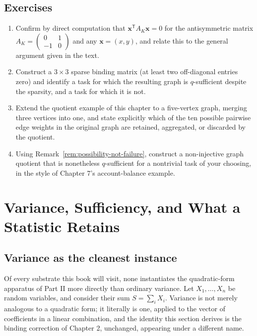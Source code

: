 \documentclass[11pt]{book}
\begin{document}
\section*{Exercises}
\begin{enumerate}
\item Confirm by direct computation that $\mathbf{x}^{\mathsf T}A_K\mathbf{x}=0$ for the antisymmetric matrix $A_K=\begin{pmatrix}0&1\\-1&0\end{pmatrix}$ and any $\mathbf{x}=(x,y)$, and relate this to the general argument given in the text.
\item Construct a $3\times3$ sparse binding matrix (at least two off-diagonal entries zero) and identify a task for which the resulting graph is $q$-sufficient despite the sparsity, and a task for which it is not.
\item Extend the quotient example of this chapter to a five-vertex graph, merging three vertices into one, and state explicitly which of the ten possible pairwise edge weights in the original graph are retained, aggregated, or discarded by the quotient.
\item Using Remark~\ref{rem:possibility-not-failure}, construct a non-injective graph quotient that is nonetheless $q$-sufficient for a nontrivial task of your choosing, in the style of Chapter 7's account-balance example.
\end{enumerate}

\chapter{Variance, Sufficiency, and What a Statistic Retains}

\section{Variance as the cleanest instance}

Of every substrate this book will visit, none instantiates the quadratic-form apparatus of Part II more directly than ordinary variance. Let $X_1,\ldots,X_n$ be random variables, and consider their sum $S=\sum_i X_i$. Variance is not merely analogous to a quadratic form; it literally is one, applied to the vector of coefficients in a linear combination, and the identity this section derives is the binding correction of Chapter 2, unchanged, appearing under a different name.
\end{document}
